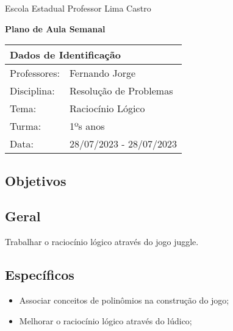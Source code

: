 \documentclass[oneside,a4paper,12pt]{article}
\newcommand{\universidade}{Escola Estadual Professor Lima Castro}
\newcommand{\professores}{Fernando Jorge}
\newcommand{\disciplina}{Resolução de Problemas}
\newcommand{\tema}{Raciocínio Lógico}
\newcommand{\turma}{1ºs anos}
\newcommand{\data}{28/07/2023 - 28/07/2023}
\begin{document}
  \pagestyle{empty}

	\begin{center}

	  \universidade
	  \par
	  \vspace{10pt}
	  \LARGE \textbf{Plano de Aula Semanal}

	\end{center}

  \vspace{10pt}

	\begin{tabular}{ |l|p{12cm}| }

	  \hline
	  \multicolumn{2}{|l|}{\textbf{Dados de Identificação}} \\
	  \hline
	  Professores:         &    \professores           \\
	  \hline
	  Disciplina:        &    \disciplina          \\
	  \hline
	  Tema:              &    \tema                \\
	  \hline
	  Turma:             &    \turma               \\
	  \hline
	  Data:              &    \data                \\
	  \hline

	\end{tabular}

  \begin{snugshade}
  \section{Objetivos} %
  \end{snugshade}

  \subsection{Geral} %

  Trabalhar o raciocínio lógico através do jogo juggle.

  \subsection{Específicos} %

    \begin{itemize}

      \item Associar conceitos de polinômios na construção do jogo;
      \item Melhorar o raciocínio lógico através do lúdico;

    \end{itemize}
\end{document}
